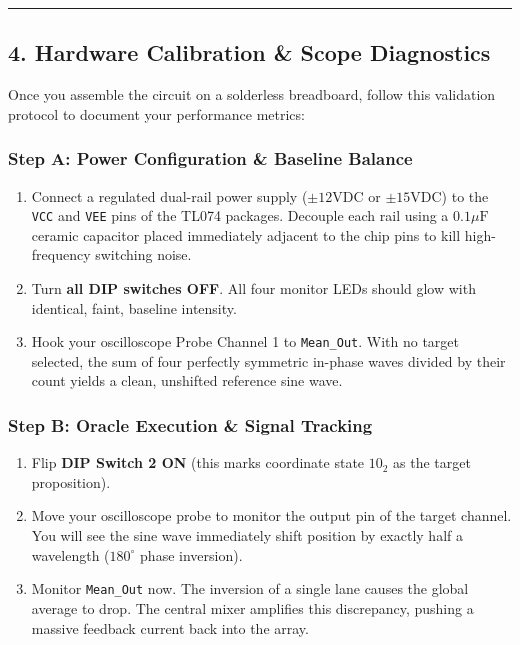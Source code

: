\documentclass[
]{article}
\providecommand{\tightlist}{%
  \setlength{\itemsep}{0pt}\setlength{\parskip}{0pt}}
\begin{document}
\begin{center}\rule{0.5\linewidth}{0.5pt}\end{center}

\subsection{4. Hardware Calibration \& Scope
Diagnostics}\label{hardware-calibration-scope-diagnostics}

Once you assemble the circuit on a solderless breadboard, follow this
validation protocol to document your performance metrics:

\subsubsection{Step A: Power Configuration \& Baseline
Balance}\label{step-a-power-configuration-baseline-balance}

\begin{enumerate}
\def\labelenumi{\arabic{enumi}.}
\tightlist
\item
  Connect a regulated dual-rail power supply (\(\pm12\text{V}\)DC or
  \(\pm15\text{V}\)DC) to the \texttt{VCC} and \texttt{VEE} pins of the
  TL074 packages. Decouple each rail using a \(0.1\mu\text{F}\) ceramic
  capacitor placed immediately adjacent to the chip pins to kill
  high-frequency switching noise.
\item
  Turn \textbf{all DIP switches OFF}. All four monitor LEDs should glow
  with identical, faint, baseline intensity.
\item
  Hook your oscilloscope Probe Channel 1 to \texttt{Mean\_Out}. With no
  target selected, the sum of four perfectly symmetric in-phase waves
  divided by their count yields a clean, unshifted reference sine wave.
\end{enumerate}

\subsubsection{Step B: Oracle Execution \& Signal
Tracking}\label{step-b-oracle-execution-signal-tracking}

\begin{enumerate}
\def\labelenumi{\arabic{enumi}.}
\tightlist
\item
  Flip \textbf{DIP Switch 2 ON} (this marks coordinate state \(10_2\) as
  the target proposition).
\item
  Move your oscilloscope probe to monitor the output pin of the target
  channel. You will see the sine wave immediately shift position by
  exactly half a wavelength (\(180^\circ\) phase inversion).
\item
  Monitor \texttt{Mean\_Out} now. The inversion of a single lane causes
  the global average to drop. The central mixer amplifies this
  discrepancy, pushing a massive feedback current back into the array.
\end{enumerate}
\end{document}
